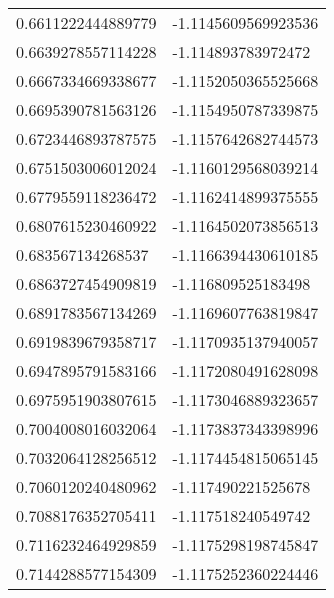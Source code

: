 \begin{supertabular}{ll}
0.6611222444889779  & -1.1145609569923536   \\
0.6639278557114228  & -1.114893783972472    \\
0.6667334669338677  & -1.1152050365525668   \\
0.6695390781563126  & -1.1154950787339875   \\
0.6723446893787575  & -1.1157642682744573   \\
0.6751503006012024  & -1.1160129568039214   \\
0.6779559118236472  & -1.1162414899375555   \\
0.6807615230460922  & -1.1164502073856513   \\
0.683567134268537   & -1.1166394430610185   \\
0.6863727454909819  & -1.116809525183498    \\
0.6891783567134269  & -1.1169607763819847   \\
0.6919839679358717  & -1.1170935137940057   \\
0.6947895791583166  & -1.1172080491628098   \\
0.6975951903807615  & -1.1173046889323657   \\
0.7004008016032064  & -1.1173837343398996   \\
0.7032064128256512  & -1.1174454815065145   \\
0.7060120240480962  & -1.117490221525678    \\
0.7088176352705411  & -1.117518240549742    \\
0.7116232464929859  & -1.1175298198745847   \\
0.7144288577154309  & -1.1175252360224446   \\
\end{supertabular}
